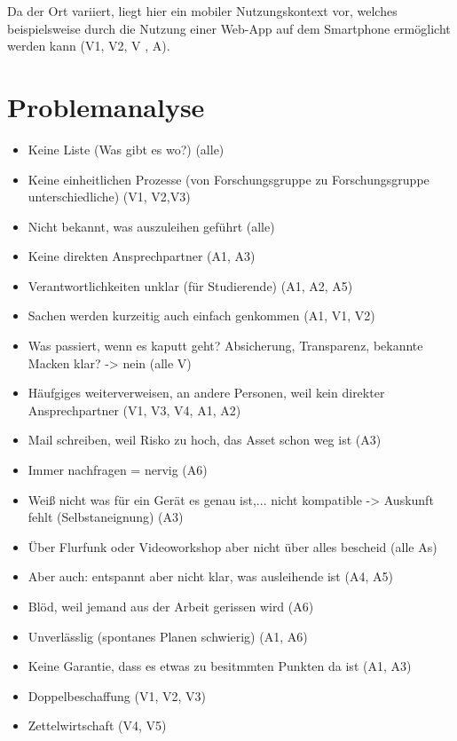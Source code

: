 Da der Ort variiert, liegt hier ein mobiler Nutzungskontext vor, welches beispielsweise durch die
Nutzung einer Web-App auf dem Smartphone ermöglicht werden kann (V1, V2, V , A).


\section{Problemanalyse}
\label{section:iststand}

\begin{itemize}
        \item Keine Liste (Was gibt es wo?) (alle)
        \item Keine einheitlichen Prozesse (von Forschungsgruppe zu Forschungsgruppe
        unterschiedliche) (V1, V2,V3)
        \item Nicht bekannt, was auszuleihen geführt (alle)
        \item Keine direkten Ansprechpartner (A1, A3)
        \item Verantwortlichkeiten unklar (für Studierende) (A1, A2, A5)
        \item Sachen werden kurzeitig auch einfach genkommen (A1, V1, V2)
        \item Was passiert, wenn es kaputt geht? Absicherung, Transparenz, bekannte Macken klar? ->
        nein (alle V)
        \item Häufgiges weiterverweisen, an andere Personen, weil kein direkter Ansprechpartner (V1,
        V3, V4, A1, A2)
        \item Mail schreiben, weil Risko zu hoch, das Asset schon weg ist (A3)
        \item Immer nachfragen = nervig (A6)
        \item Weiß nicht was für ein Gerät es genau ist,... nicht kompatible -> Auskunft fehlt
        (Selbstaneignung) (A3)
        \item Über Flurfunk oder Videoworkshop aber nicht über alles bescheid (alle As)
        \item Aber auch: entspannt aber nicht klar, was ausleihende ist (A4, A5)
        \item Blöd, weil jemand aus der Arbeit gerissen wird (A6)
        \item Unverlässlig (spontanes Planen schwierig) (A1, A6)
        \item Keine Garantie, dass es etwas zu besitmmten Punkten da ist (A1, A3)
        \item Doppelbeschaffung (V1, V2, V3)
        \item Zettelwirtschaft (V4, V5)

\end{itemize}
